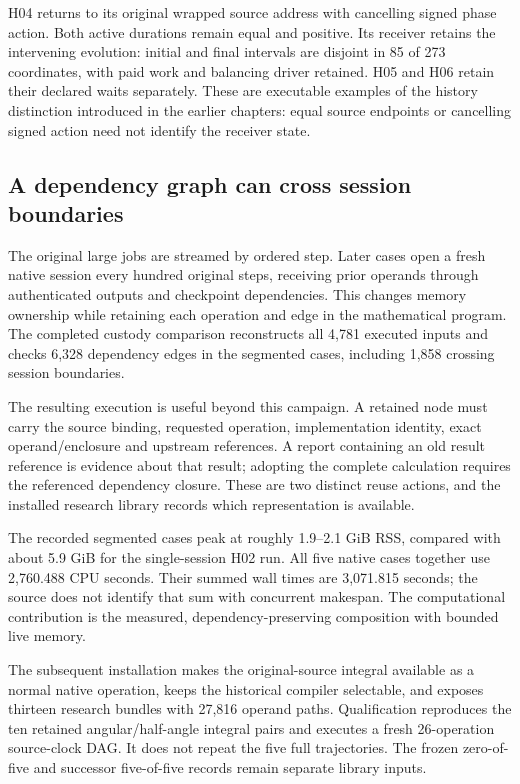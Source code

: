H04 returns to its original wrapped source address with cancelling signed phase action. Both active durations remain equal and positive. Its receiver retains the intervening evolution: initial and final intervals are disjoint in 85 of 273 coordinates, with paid work and balancing driver retained. H05 and H06 retain their declared waits separately. These are executable examples of the history distinction introduced in the earlier chapters: equal source endpoints or cancelling signed action need not identify the receiver state.

\subsection{A dependency graph can cross session boundaries}

The original large jobs are streamed by ordered step. Later cases open a fresh native session every hundred original steps, receiving prior operands through authenticated outputs and checkpoint dependencies. This changes memory ownership while retaining each operation and edge in the mathematical program. The completed custody comparison reconstructs all 4,781 executed inputs and checks 6,328 dependency edges in the segmented cases, including 1,858 crossing session boundaries.

The resulting execution is useful beyond this campaign. A retained node must carry the source binding, requested operation, implementation identity, exact operand/enclosure and upstream references. A report containing an old result reference is evidence about that result; adopting the complete calculation requires the referenced dependency closure. These are two distinct reuse actions, and the installed research library records which representation is available.

The recorded segmented cases peak at roughly 1.9--2.1 GiB RSS, compared with about 5.9 GiB for the single-session H02 run. All five native cases together use 2,760.488 CPU seconds. Their summed wall times are 3,071.815 seconds; the source does not identify that sum with concurrent makespan. The computational contribution is the measured, dependency-preserving composition with bounded live memory.

The subsequent installation makes the original-source integral available as a normal native operation, keeps the historical compiler selectable, and exposes thirteen research bundles with 27,816 operand paths. Qualification reproduces the ten retained angular/half-angle integral pairs and executes a fresh 26-operation source-clock DAG. It does not repeat the five full trajectories. The frozen zero-of-five and successor five-of-five records remain separate library inputs.

